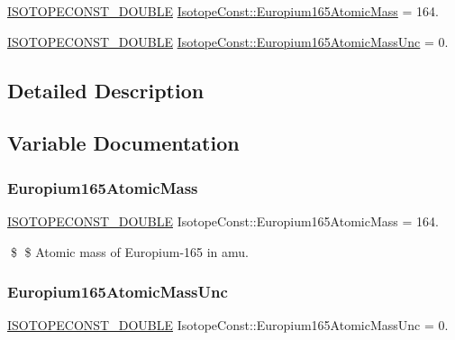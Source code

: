 \begin{DoxyCompactItemize}
\item 
\mbox{\hyperlink{group___isotope_const-_macros_ga8f45a7272ce02c0b4c65c44636ed719a}{I\+S\+O\+T\+O\+P\+E\+C\+O\+N\+S\+T\+\_\+\+D\+O\+U\+B\+LE}} \mbox{\hyperlink{group___isotope_const-_europium-_eu165_gac059f1d36526452842b0cde037bc2eb2}{Isotope\+Const\+::\+Europium165\+Atomic\+Mass}} = 164.
\item 
\mbox{\hyperlink{group___isotope_const-_macros_ga8f45a7272ce02c0b4c65c44636ed719a}{I\+S\+O\+T\+O\+P\+E\+C\+O\+N\+S\+T\+\_\+\+D\+O\+U\+B\+LE}} \mbox{\hyperlink{group___isotope_const-_europium-_eu165_gaf18d0f0006208a063bc1540dcee98a08}{Isotope\+Const\+::\+Europium165\+Atomic\+Mass\+Unc}} = 0.
\end{DoxyCompactItemize}


\subsection{Detailed Description}


\subsection{Variable Documentation}
\mbox{\label{group___isotope_const-_europium-_eu165_gac059f1d36526452842b0cde037bc2eb2}} 
\subsubsection{\texorpdfstring{Europium165\+Atomic\+Mass}{Europium165AtomicMass}}
{\footnotesize\ttfamily \mbox{\hyperlink{group___isotope_const-_macros_ga8f45a7272ce02c0b4c65c44636ed719a}{I\+S\+O\+T\+O\+P\+E\+C\+O\+N\+S\+T\+\_\+\+D\+O\+U\+B\+LE}} Isotope\+Const\+::\+Europium165\+Atomic\+Mass = 164.}

\$ \$ Atomic mass of Europium-\/165 in amu. \mbox{\label{group___isotope_const-_europium-_eu165_gaf18d0f0006208a063bc1540dcee98a08}} 
\subsubsection{\texorpdfstring{Europium165\+Atomic\+Mass\+Unc}{Europium165AtomicMassUnc}}
{\footnotesize\ttfamily \mbox{\hyperlink{group___isotope_const-_macros_ga8f45a7272ce02c0b4c65c44636ed719a}{I\+S\+O\+T\+O\+P\+E\+C\+O\+N\+S\+T\+\_\+\+D\+O\+U\+B\+LE}} Isotope\+Const\+::\+Europium165\+Atomic\+Mass\+Unc = 0.}

